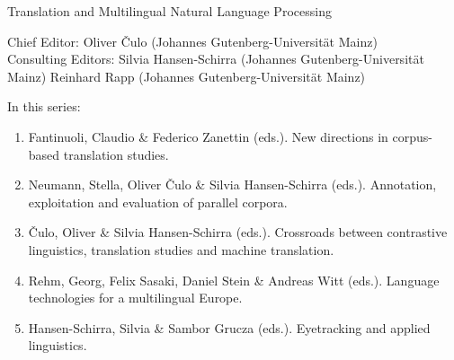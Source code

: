 {\large Translation and Multilingual Natural Language Processing}

\bigskip

Chief Editor: Oliver \v{C}ulo (Johannes Gutenberg-Universität Mainz) \\
Consulting Editors: Silvia Hansen-Schirra (Johannes Gutenberg-Universität Mainz)
Reinhard Rapp (Johannes Gutenberg-Universität Mainz)

\bigskip

In this series:

\begin{enumerate}
\item Fantinuoli, Claudio \& Federico Zanettin (eds.). New directions in corpus-based translation studies.
\item Neumann, Stella, Oliver Čulo \& Silvia Hansen-Schirra (eds.). Annotation, exploitation and evaluation of parallel corpora.%
\item Čulo, Oliver  \& Silvia Hansen-Schirra (eds.). Crossroads between contrastive linguistics, translation studies and machine translation. %
\item Rehm, Georg, Felix Sasaki, Daniel Stein \& Andreas Witt (eds.). Language technologies for a multilingual Europe. %
\item Hansen-Schirra, Silvia \& Sambor Grucza (eds.). Eyetracking and applied linguistics.
\end{enumerate}

 
